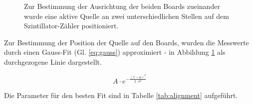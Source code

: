 \documentclass[usenames,dvipsnames]{include/protokollclass}
\begin{document}
	\begin{figure}
		\centering
	\label{fig:alignment_1}
	\label{fig:alignment_2}	
	\caption{Zur Bestimmung der Ausrichtung der beiden Boards zueinander wurde eine aktive Quelle an zwei unterschiedlichen Stellen auf dem Szintillator-Zähler positioniert.}
	\label{fig:alignment}
	\end{figure}

	Zur Bestimmung der Position der Quelle auf den Boards, wurden die Messwerte durch einen Gauss-Fit (Gl. \ref{eq:gauss}) approximiert - in Abbildung \ref{fig:alignment} als durchgezogene Linie dargestellt.
	
\begin{equation}
 	A\cdot e^{-\frac{(x-\mu)^{2}}{2\cdot \sigma^{2}}}
 	\label{eq:gauss}
\end{equation}
	
	Die Parameter für den besten Fit sind in Tabelle \ref{tab:alignment} aufgeführt.
	
\end{document}
